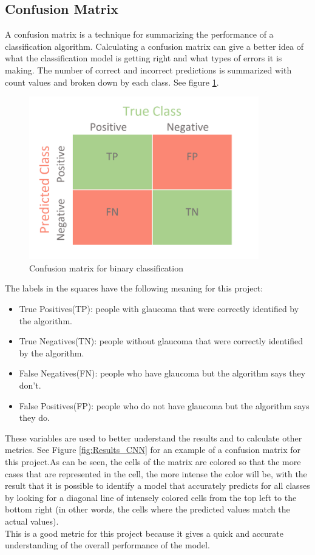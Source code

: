 \documentclass[11pt, a4paper]{article}
\begin{document}
\subsection{Confusion Matrix}
A confusion matrix is a technique for summarizing the performance of a classification algorithm. Calculating a confusion matrix can give a better idea of what the classification model is getting right and what types of errors it is making. The number of correct and incorrect predictions is summarized with count values and broken down by each class. See figure \ref{fig:Confusion_matrix_for_binary_classification}.
\begin{figure}[H]
	\centering
	\includegraphics[width=10cm]{imgs/general/Confusion_matrix_for_binary_classification.png}
	\caption{Confusion matrix for binary classification}
	 \label{fig:Confusion_matrix_for_binary_classification}
\end{figure}
\noindent The labels in the squares have the following meaning for this project:
\begin{itemize}
    \item True Positives(TP): people with glaucoma that were correctly identified by the algorithm.
    \item True Negatives(TN): people without glaucoma that were correctly identified by the algorithm.
    \item False Negatives(FN): people who have glaucoma but the algorithm says they don't.
    \item False Positives(FP): people who do not have glaucoma but the algorithm says they do.
\end{itemize}
These variables are used to better understand the results and to calculate other metrics. See Figure \ref{fig:Results_CNN} for an example of a confusion matrix for this project.As can be seen, the cells of the matrix are colored so that the more cases that are represented in the cell, the more intense the color will be, with the result that it is possible to identify a model that accurately predicts for all classes by looking for a diagonal line of intensely colored cells from the top left to the bottom right (in other words, the cells where the predicted values match the actual values). 
\\
This is a good metric for this project because it gives a quick and accurate understanding of the overall performance of the model.
\end{document}
